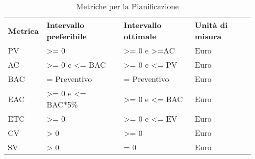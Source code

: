 \renewcommand{\arraystretch}{2.2}
\begin{longtable}{|C{2cm}|C{3.5cm}|C{3.5cm}|C{3cm}|}
	
	\caption{Metriche per la Pianificazione }\\
	\hline
	
	\textbf{Metrica} & \textbf{Intervallo preferibile}  & \textbf{Intervallo ottimale} & \textbf{Unità di misura}
	\tabularnewline
	\endfirsthead
	
	PV & >= 0 & >= 0 e >=AC & Euro \\
	AC & >= 0 e <= BAC & >= 0 e <= PV & Euro \\
	BAC & = Preventivo  & = Preventivo & Euro \\ 
	EAC & >= 0 e <= BAC*5\%& >= 0 e <= BAC & Euro \\	
	ETC & >= 0 & >= 0 e <= EV & Euro \\
	CV & > 0 & >= 0 & Euro \\
	SV & > 0 & = 0 & Euro \\
\end{longtable}

